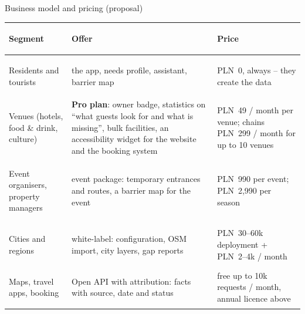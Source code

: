 \begin{frame}{Business model and pricing (proposal)}
  \scriptsize
  \renewcommand{\arraystretch}{1.15}
  \begin{tabularx}{\textwidth}{@{}>{\bfseries\raggedright\arraybackslash}p{3.0cm} X >{\raggedright\arraybackslash}p{4.2cm}@{}}
    \toprule
    Segment & Offer & Price \\
    \midrule
    Residents and tourists & the app, needs profile, assistant, barrier map & PLN~0, always -- they create the data \\
    Venues (hotels, food \& drink, culture) & \textbf{Pro plan}: owner badge, statistics on “what guests look for and what is missing”,
      bulk facilities, an accessibility widget for the website and the booking system & PLN~49 / month per venue; chains PLN~299 / month for up to 10 venues \\
    Event organisers, property managers & event package: temporary entrances and routes, a barrier map for the event & PLN~990 per event; PLN~2,990 per season \\
    Cities and regions & white-label: configuration, OSM import, city layers, gap reports & PLN~30--60k deployment + PLN~2--4k / month \\
    Maps, travel apps, booking & Open API with attribution: facts with source, date and status & free up to 10k requests / month, annual licence above \\
    \bottomrule
  \end{tabularx}


\end{frame}
